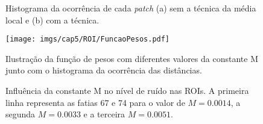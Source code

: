 \begin{figure}[H]
	\centering
	
	\caption{Histograma da ocorrência de cada \textit{patch} (a) sem a técnica da média local e (b) com a técnica.}
	
	
	\label{fig:imgCap5ROIPatch}
\end{figure}

 \begin{figure}[H]
 	\caption{Ilustração da função de pesos com diferentes valores da constante M junto com o histograma da ocorrência das distâncias.}
	\begin{center}
		\texttt{[image: imgs/cap5/ROI/FuncaoPesos.pdf]}
	\end{center}
	
	\label{fig:imgCap5FuncaoPesos}
\end{figure} 

\begin{figure}[H]
	\centering
	
	\caption{Influência da constante M no nível de ruído nas \acs{ROI}s. A primeira linha representa as fatias 67 e 74 para o valor de $M=0.0014$, a segunda $M=0.0033$ e a terceira $M=0.0051$.}
	
	
	
	
	\label{fig:imgCap5DiffM}
\end{figure}






